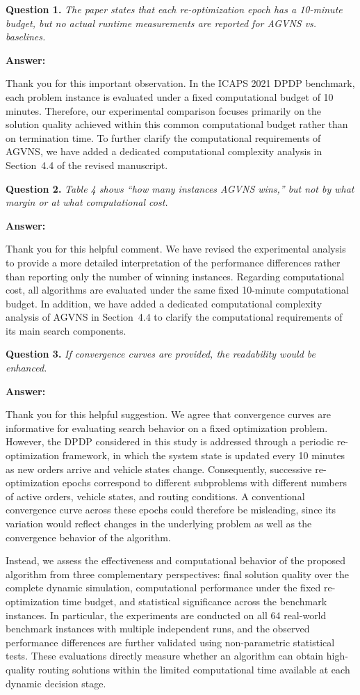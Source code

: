 \documentclass[11pt]{article}
\newcommand{\question}[2]{\vspace{0.5em}\noindent\textbf{Question #1.} \emph{#2}\par}
\newcommand{\answer}{\noindent\textbf{Answer:}\par}
\begin{document}
\question{1}{The paper states that each re-optimization epoch has a 10-minute budget, but no actual runtime measurements are reported for AGVNS vs. baselines.}

\answer
Thank you for this important observation. In the ICAPS 2021 DPDP benchmark, each problem instance is evaluated under a fixed computational budget of 10 minutes. Therefore, our experimental comparison focuses primarily on the solution quality achieved within this common computational budget rather than on termination time. To further clarify the computational requirements of AGVNS, we have added a dedicated computational complexity analysis in Section~4.4 of the revised manuscript.

\question{2}{Table 4 shows ``how many instances AGVNS wins,'' but not by what margin or at what computational cost.}

\answer
Thank you for this helpful comment. We have revised the experimental analysis to provide a more detailed interpretation of the performance differences rather than reporting only the number of winning instances. Regarding computational cost, all algorithms are evaluated under the same fixed 10-minute computational budget. In addition, we have added a dedicated computational complexity analysis of AGVNS in Section~4.4 to clarify the computational requirements of its main search components.

\question{3}{If convergence curves are provided, the readability would be enhanced.}
\answer
Thank you for this helpful suggestion. We agree that convergence curves are informative for evaluating search behavior on a fixed optimization problem. However, the DPDP considered in this study is addressed through a periodic re-optimization framework, in which the system state is updated every 10 minutes as new orders arrive and vehicle states change. Consequently, successive re-optimization epochs correspond to different subproblems with different numbers of active orders, vehicle states, and routing conditions. A conventional convergence curve across these epochs could therefore be misleading, since its variation would reflect changes in the underlying problem as well as the convergence behavior of the algorithm.

Instead, we assess the effectiveness and computational behavior of the proposed algorithm from three complementary perspectives: final solution quality over the complete dynamic simulation, computational performance under the fixed re-optimization time budget, and statistical significance across the benchmark instances. In particular, the experiments are conducted on all 64 real-world benchmark instances with multiple independent runs, and the observed performance differences are further validated using non-parametric statistical tests. These evaluations directly measure whether an algorithm can obtain high-quality routing solutions within the limited computational time available at each dynamic decision stage.
\end{document}

